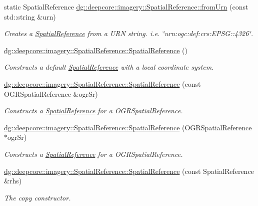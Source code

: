 \begin{DoxyCompactItemize}
static Spatial\+Reference \hyperlink{group___imagery_module_ga095e8735cdb0a9a8f72fbb1351e86d95}{dg\+::deepcore\+::imagery\+::\+Spatial\+Reference\+::from\+Urn} (const std\+::string \&urn)
\begin{DoxyCompactList}\small\item\em Creates a \hyperlink{classdg_1_1deepcore_1_1imagery_1_1_spatial_reference}{Spatial\+Reference} from a U\+RN string. i.\+e. \char`\"{}urn\+:ogc\+:def\+:crs\+:\+E\+P\+S\+G\+::4326\char`\"{}. \end{DoxyCompactList}\item 
\hyperlink{group___imagery_module_ga2e25c945785b2ff07d5d74799e7f6bf2}{dg\+::deepcore\+::imagery\+::\+Spatial\+Reference\+::\+Spatial\+Reference} ()
\begin{DoxyCompactList}\small\item\em Constructs a default \hyperlink{classdg_1_1deepcore_1_1imagery_1_1_spatial_reference}{Spatial\+Reference} with a local coordinate system. \end{DoxyCompactList}\item 
\hyperlink{group___imagery_module_ga452d78706b3707b85196d436524990ce}{dg\+::deepcore\+::imagery\+::\+Spatial\+Reference\+::\+Spatial\+Reference} (const O\+G\+R\+Spatial\+Reference \&ogr\+Sr)
\begin{DoxyCompactList}\small\item\em Constructs a \hyperlink{classdg_1_1deepcore_1_1imagery_1_1_spatial_reference}{Spatial\+Reference} for a O\+G\+R\+Spatial\+Reference. \end{DoxyCompactList}\item 
\hyperlink{group___imagery_module_ga7a9a85f737572787a550c16479d81a71}{dg\+::deepcore\+::imagery\+::\+Spatial\+Reference\+::\+Spatial\+Reference} (O\+G\+R\+Spatial\+Reference $\ast$ogr\+Sr)
\begin{DoxyCompactList}\small\item\em Constructs a \hyperlink{classdg_1_1deepcore_1_1imagery_1_1_spatial_reference}{Spatial\+Reference} for a O\+G\+R\+Spatial\+Reference. \end{DoxyCompactList}\item 
\hyperlink{group___imagery_module_gabc2eddb1ac0a4675ae9a26afc6f217e9}{dg\+::deepcore\+::imagery\+::\+Spatial\+Reference\+::\+Spatial\+Reference} (const Spatial\+Reference \&rhs)
\begin{DoxyCompactList}\small\item\em The copy constructor. \end{DoxyCompactList}\item 

\end{DoxyCompactItemize}

